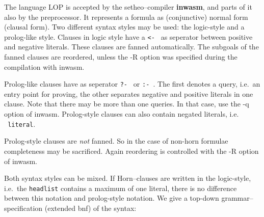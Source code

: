 

The language LOP is accepted by the setheo--compiler {\bf inwasm}, and
parts of it also by the preprocessor. It represents a formula as (conjunctive)
normal form (clausal form).
Two different syntax styles may be used: the logic-style and a prolog-like
style.
Clauses in logic style have a {\tt <- } as seperator between
positive and negative literals.
These clauses are fanned automatically. The subgoals of the fanned
clauses are reordered, unless the -R option was specified during the
compilation with inwasm.

Prolog-like clauses have as seperator {\tt ?- } or {\tt :- }.
The first denotes a query, i.e.\ an entry point for proving,
the other separates negative and positive literals in one clause.
Note that there may be more than one queries. In that case, use the
-q option of inwasm.
Prolog-style clauses can also contain negated literals, i.e. {\tt ~literal}.

Prolog-style clauses are {\it not\/} fanned. So in the case of non-horn
formulae completeness may be sacrificed. Again reordering is
controlled with the -R option of inwasm.
 
Both syntax styles can be mixed.
If Horn--clauses
are written in the logic-style, i.e.\ the {\tt headlist} contains a maximum
of one literal, there is no difference between this notation and prolog-style
notation. 
 We give a top-down grammar--specification
(extended bnf)
of the syntax:

